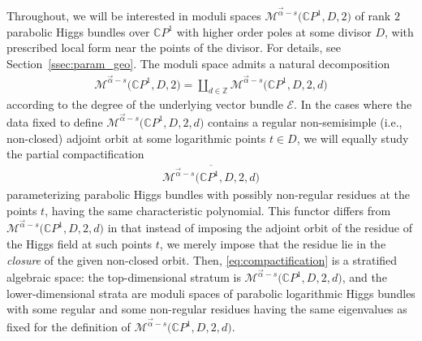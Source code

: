 \documentclass[10pt,a4paper]{amsart}
\newcommand{\Z}{{\mathbb Z}} %
\newcommand{\CP}[1]{\mathbb{C}P^{#1}} %
\newcommand{\E}{{\mathcal E}} %
\newcommand{\Mod}{{\mathcal M}} %
\numberwithin{equation}{section}
\begin{document}
Throughout, we will be interested in moduli spaces $\Mod^{\vec{\alpha}-s} \big(\CP1, D, 2\big)$ of rank $2$ parabolic Higgs
bundles over $\CP1$ with higher order poles at some divisor $D$, with prescribed local form near the points of the
divisor. For details, see Section~\ref{ssec:param_geo}. The moduli space admits a natural decomposition
\begin{gather*}
 \Mod^{\vec{\alpha}-s} \big(\CP1, D, 2\big) = \coprod_{d\in\Z} \Mod^{\vec{\alpha}-s} \big(\CP1, D, 2, d\big)
\end{gather*}
according to the degree of the underlying vector bundle $\E$. In the cases where the data fixed to define $\Mod^{\vec{\alpha}-s} \big(\CP1, D, 2, d\big)$
contains a regular non-semisimple (i.e., non-closed) adjoint orbit at some logarithmic points $t\in D$, we will equally study the partial compactification
\begin{gather}\label{eq:compactification}
 \overline{\Mod^{\vec{\alpha}-s} \big(\CP1, D, 2, d\big)}
\end{gather}
parameterizing parabolic Higgs bundles with possibly non-regular residues at the points $t$, having the same characteristic polynomial.
This functor differs from $\Mod^{\vec{\alpha}-s} \big(\CP1, D, 2, d\big)$ in that instead of imposing the adjoint orbit of the residue of the Higgs field
at such points $t$, we merely impose that the residue lie in the \emph{closure} of the given non-closed orbit.
Then, \eqref{eq:compactification} is a stratified algebraic space: the
top-dimensional stratum is $\Mod^{\vec{\alpha}-s} \big(\CP1, D, 2, d\big)$, and
the lower-dimensional strata are moduli spaces of parabolic
logarithmic Higgs bundles with some regular and some non-regular
residues having the same eigenvalues as fixed for the definition of
$\Mod^{\vec{\alpha}-s} \big(\CP1, D, 2,d\big)$.
\end{document}
